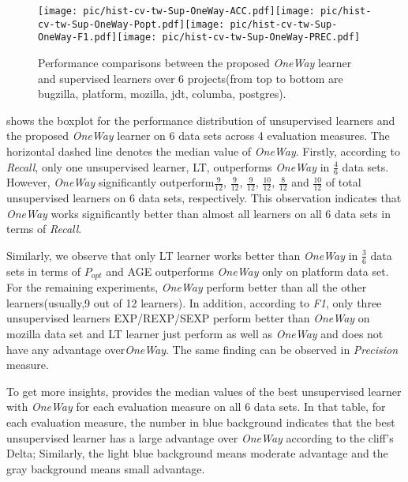 \begin{figure*}[htbp]
\begin{center}
 \texttt{[image: pic/hist-cv-tw-Sup-OneWay-ACC.pdf]}\texttt{[image: pic/hist-cv-tw-Sup-OneWay-Popt.pdf]}\texttt{[image: pic/hist-cv-tw-Sup-OneWay-F1.pdf]}\texttt{[image: pic/hist-cv-tw-Sup-OneWay-PREC.pdf]}
\caption{Performance comparisons between the proposed {\it OneWay} learner and supervised learners over 6 projects(from top to bottom are  bugzilla, platform, mozilla, jdt, columba, postgres).}
\label{fig:sup_oneway}
\end{center}
\end{figure*}

 shows the boxplot for the performance distribution of
unsupervised learners and the proposed
{\it OneWay} learner on 6 data sets across 4 evaluation measures. The horizontal 
dashed line denotes the median value of {\it OneWay}. Firstly, according to {\it Recall},
only one unsupervised learner, LT, outperforms {\it OneWay} in $\frac{4}{6}$ data sets. However, {\it OneWay}
significantly outperform$\frac{9}{12}$, $\frac{9}{12}$, $\frac{9}{12}$, $\frac{10}{12}$,
 $\frac{8}{12}$ and $\frac{10}{12}$ of total unsupervised learners on 6 data sets, respectively.
 This observation indicates that {\it OneWay} works significantly better 
 than almost all learners on all 6 data sets in terms of {\it Recall}.
 
 Similarly, we observe that only LT learner works better than {\it OneWay} in
$\frac{3}{6}$ data sets in terms of {\it $P_{opt}$} and AGE outperforms {\it OneWay} only on platform data set.
For the remaining experiments, {\it OneWay} perform better than all the other learners(usually,9 out of 12 learners). In addition, according to {\it F1}, only three unsupervised learners EXP/REXP/SEXP 
perform better than {\it OneWay} on mozilla data set and
LT learner just perform as well as {\it OneWay} and does not have any advantage over{\it OneWay}. The same finding can be observed in {\it Precision} measure.

To get more insights,  provides the median values of the best unsupervised learner with {\it OneWay}
for each evaluation measure on all 6 data sets. In that table, for each evaluation measure,
the number in blue background indicates that the best unsupervised learner has a large advantage
over {\it OneWay} according to the cliff's Delta; Similarly, the light blue background means moderate advantage
and the gray background means small advantage. 

